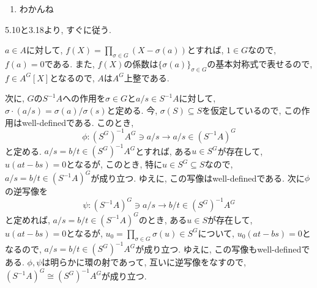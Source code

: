 \documentclass[dvipdfmx]{jsarticle}
\begin{document}
\begin{problem}
\begin{enumerate}
            \item \begin{description}
                \color{red}わかんね\color{black}
            \end{description}
        \end{enumerate}
    \end{problem}

    \begin{problem}
        5.10と3.18より, すぐに従う.
    \end{problem}

    \begin{problem}
        $a \in A$に対して, $f(X) = \prod_{\sigma \in G}(X-\sigma(a))$とすれば, $1 \in G$なので,
        $f(a) = 0$である.
        また, $f(X)$の係数は$\{\sigma(a)\}_{\sigma \in G}$の基本対称式で表せるので,
        $f \in A^G[X]$となるので, $A$は$A^G$上整である.

        次に, $G$の$S^{-1}A$への作用を$\sigma \in G$と$a/s \in S^{-1}A$に対して,
        $\sigma \cdot (a/s) = \sigma(a)/\sigma(s)$と定める.
        今, $\sigma(S) \subseteq S$を仮定しているので,
        この作用はwell-definedである.
        このとき,
        \[
            \phi: (S^{G})^{-1}A^{G} \ni a/s \longrightarrow a/s \in (S^{-1}A)^G
        \]
        と定める.
        $a/s = b/t \in (S^G)^{-1}A^G$とすれば,
        ある$u \in S^G$が存在して, $u(at-bs) = 0$となるが,
        このとき, 特に$u \in S^G \subseteq S$なので, $a/s = b/t \in (S^{-1}A)^G$が成り立つ.
        ゆえに, この写像はwell-definedである.
        次に$\phi$の逆写像を
        \[
            \psi: (S^{-1}A)^G \ni a/s \longrightarrow b/t \in (S^G)^{-1}A^G
        \]
        と定めれば, $a/s = b/t \in (S^{-1}A)^G$のとき,
        ある$u \in S$が存在して, $u(at-bs) = 0$となるが,
        $u_0 = \prod_{\sigma \in G} \sigma(u) \in S^{G}$について,
        $u_0(at-bs) = 0$となるので, $a/s = b/t \in (S^{G})^{-1}A^G$が成り立つ.
        ゆえに, この写像もwell-definedである.
        $\phi, \psi$は明らかに環の射であって, 互いに逆写像をなすので,
        $(S^{-1}A)^G \cong (S^G)^{-1}A^G$が成り立つ.
    \end{problem}
\end{document}

